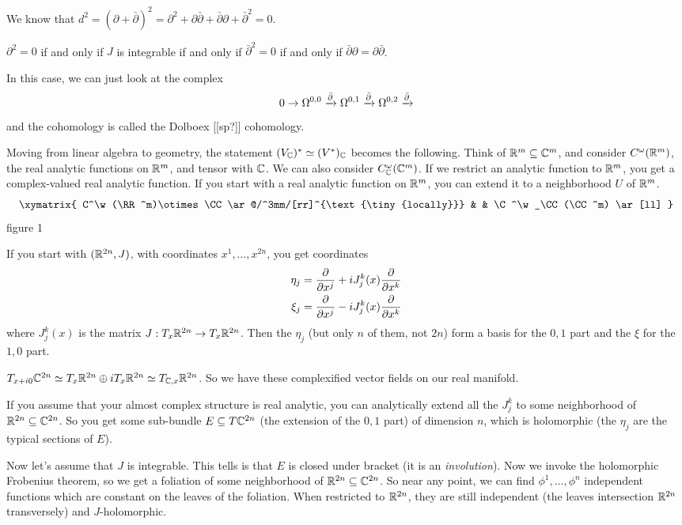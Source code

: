  We know that $d^2=(\partial+\bar\partial)^2 =
 \partial^2+\partial\bar\partial + \bar\partial\partial
 +\bar\partial^2 =0$.

 \begin{proposition}
   $\partial^2=0$ if and only if $J$ is integrable if and only if
   $\bar\partial^2=0$ if and only if
   $\bar\partial\partial=\partial\bar\partial$.
 \end{proposition}

 In this case, we can just look at the complex
 \[
   0\to \Omega^{0,0}\xrightarrow{\bar\partial}
    \Omega^{0,1}\xrightarrow{\bar\partial} \Omega^{0,2}\xrightarrow{\bar\partial}
 \]
 and the cohomology is called the Dolboex [[sp?]] cohomology.

 Moving from linear algebra to geometry, the statement
 $(V_{\mathbb{C}})^*\simeq (V^*)_{\mathbb{C}}$ becomes the following.  Think of
 $\mathbb{R}^m\subseteq \mathbb{C}^m$, and consider $C^{\omega}(\mathbb{R}^m)$, the real
 analytic functions on $\mathbb{R}^m$, and tensor with $\mathbb{C}$.  We can
 also consider $C^{\omega}_{\mathbb{C}}(\mathbb{C}^m)$.  If we restrict an analytic
 function to $\mathbb{R}^m$, you get a complex-valued real analytic
 function.  If you start with a real analytic function on $\mathbb{R}^m$,
 you can extend it to a neighborhood $U$ of $\mathbb{R}^m$.
 \[\xymatrix  {
  C^\w(\RR^m)\otimes \CC \ar@/^3mm/[rr]^{\text{\tiny{locally}}} & & \C^\w_\CC(\CC^m) \ar[ll]
 }\]
 figure 1

 If you start with $(\mathbb{R}^{2n},J)$, with coordinates $x^1,\dots,
 x^{2n}$, you get coordinates
 \begin{align*}
   \eta_j &= \frac{\partial }{\partial x^j} + iJ_j^k(x)\frac{\partial }{\partial x^k}\\
   \xi_j &= \frac{\partial }{\partial x^j} - iJ_j^k(x)\frac{\partial }{\partial x^k}
 \end{align*}
 where $J_j^k(x)$ is the matrix $J:T_x\mathbb{R}^{2n}\to T_x\mathbb{R}^{2n}$.
 Then the $\eta_j$ (but only $n$ of them, not
 $2n$) form a basis for the $0,1$ part and the
 $\xi$ for the $1,0$ part.

 $T_{x+i0}\mathbb{C}^{2n} \simeq T_x\mathbb{R}^{2n} \oplus iT_x\mathbb{R}^{2n} \simeq
 T_{\mathbb{C},x}\mathbb{R}^{2n}$.  So we have these complexified vector fields
 on our real manifold.

 If you assume that your almost complex structure is real
 analytic, you can analytically extend all the $J_j^k$ to some
 neighborhood of $\mathbb{R}^{2n}\subseteq \mathbb{C}^{2n}$.  So you get some
 sub-bundle $E\subseteq T\mathbb{C}^{2n}$ (the extension of the $0,1$
 part) of dimension $n$, which is holomorphic (the $\eta_j$ are
 the typical sections of $E$).

 Now let's assume that $J$ is integrable.  This tells is that $E$
 is closed under bracket (it is an \emph{involution}).  Now we
 invoke the holomorphic Frobenius theorem, so we get a foliation
 of some neighborhood of $\mathbb{R}^{2n}\subseteq\mathbb{C}^{2n}$.  So near any
 point, we can find $\phi^1,\dots, \phi^n$ independent functions
 which are constant on the leaves of the foliation.  When
 restricted to $\mathbb{R}^{2n}$, they are still independent (the leaves
 intersection $\mathbb{R}^{2n}$ transversely) and $J$-holomorphic.

